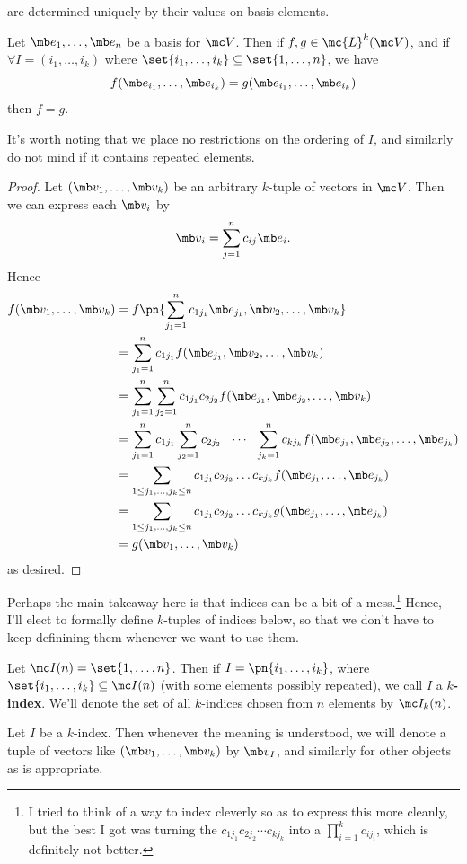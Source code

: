 \documentclass{fkbook}
\theoremstyle{snazzydefinition}
\begin{document}
are determined uniquely by their values on basis elements.
\begin{theorem}
  Let $\mb e_1, \ldots, \mb e_n$ be a basis for $\mc V$. Then if $f,g
  \in \mc{L}^k(\mc V)$, and if $\forall I = (i_1, \ldots, i_k)$ where
  $\set{i_1, \ldots, i_k} \subseteq \set{1,\ldots,n}$, we have
  \[
    f(\mb e_{i_1}, \ldots, \mb e_{i_k}) = g(\mb e_{i_1}, \ldots, \mb
    e_{i_k})
  \]
  then $f = g$.
\end{theorem}
It's worth noting that we place no restrictions on the ordering of
$I$, and similarly do not mind if it contains repeated elements.
\begin{proof}
  Let $(\mb v_1, \ldots, \mb v_k)$ be an arbitrary $k$-tuple of
  vectors in $\mc V$. Then we can express each $\mb v_i$ by
  \[
    \mb v_i = \sum_{j=1}^n c_{ij} \mb e_i.
  \]
  Hence
  \begin{align*}
    f(\mb v_1, \ldots, \mb v_k)
    &= f\pn{\sum_{j_1=1}^n c_{1j_1}\mb e_{j_1}, \mb v_2, \ldots, \mb
      v_k} \\
    &= \sum_{j_1=1}^n c_{1j_1} f(\mb e_{j_1}, \mb v_2, \ldots, \mb
      v_k) \\
    &= \sum_{j_1=1}^n \sum_{j_2=1}^n c_{1j_1} c_{2j_2} f(\mb e_{j_1},
      \mb e_{j_2}, \ldots, \mb v_k) \\
    &= \sum_{j_1=1}^n c_{1j_1} \sum_{j_2=1}^n c_{2j_2}
      \hspace{.25cm}\cdots\hspace{.25cm} \sum_{j_k=1}^n c_{kj_k} f(\mb
      e_{j_1}, \mb e_{j_2}, \ldots, \mb e_{j_k}) \\
    &= \sum_{1 \leq j_1, \ldots, j_k \leq n} c_{1j_1} c_{2j_2} \ldots
      c_{kj_k} f(\mb e_{j_1}, \ldots, \mb e_{j_k}) \\
    &= \sum_{1 \leq j_1, \ldots, j_k \leq n} c_{1j_1} c_{2j_2} \ldots
      c_{kj_k} g(\mb e_{j_1}, \ldots, \mb e_{j_k}) \\
    &= g(\mb v_1, \ldots, \mb v_k)
  \end{align*}
  as desired.
\end{proof}
Perhaps the main takeaway here is that indices can be a bit of a
mess.\footnote{I tried to think of a way to index cleverly so as to
  express this more cleanly, but the best I got was turning the
  $c_{1j_1} c_{2j_2} \cdots c_{kj_k}$ into a $\prod_{i=1}^k c_{ij_i}$,
  which is definitely not better.} Hence, I'll elect to formally
define $k$-tuples of indices below, so that we don't have to keep
definining them whenever we want to use them.
\begin{definition}
  Let $\mc I(n) = \set{1, \ldots, n}$. Then if $I = \pn{i_1, \ldots,
    i_k}$, where $\set{i_1, \ldots, i_k} \subseteq \mc I(n)$ (with
  some elements possibly repeated), we call $I$ a \textbf{$k$-index}.
  We'll denote the set of all $k$-indices chosen from $n$ elements by
  $\mc I_k(n)$.
\end{definition}
Let $I$ be a $k$-index. Then whenever the meaning is understood, we
will denote a tuple of vectors like $(\mb v_1, \ldots, \mb v_k)$ by
$\mb v_{I}$, and similarly for other objects as is appropriate.
\end{document}
